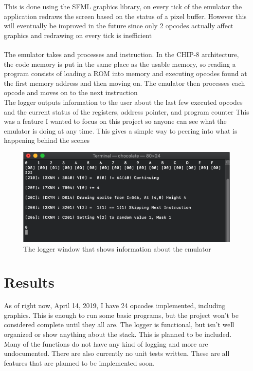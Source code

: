 \documentclass[12pt]{IEEEtran}
\begin{document}
This is done using the SFML graphics library, on every tick of the emulator the application redraws the screen based on the status of a pixel buffer.
However this will eventually be improved in the future since only 2 opcodes actually affect graphics and redrawing on every tick is inefficient
\\
\\The emulator takes and processes and instruction. In the CHIP-8 architecture, the code memory is put in the same place as the usable memory, so reading a program consists of
loading a ROM into memory and executing opcodes found at the first memory address and then moving on. The emulator then processes each opcode and moves on to the next instruction
\\
The logger outputs information to the user about the last few executed opcodes and the current status of the registers, address pointer, and program counter
This was a feature I wanted to focus on this project so anyone can see what the emulator is doing at any time. This gives a simple way to peering into what is happening behind the scenes
\begin{figure}[h]
    \includegraphics[width=\linewidth]{logger.png}
    \caption{The logger window that shows information about the emulator}
\end{figure}


\section{Results}
As of right now, April 14, 2019, I have 24 opcodes implemented, including graphics. This is enough to run some basic programs, but the project won't be
considered complete until they all are. The logger is functional, but isn't well organized or show anything about the stack. This is planned to be included.
Many of the functions do not have any kind of logging and more are undocumented. There are also currently no unit tests written.
These are all features that are planned to be implemented soon.
\end{document}
